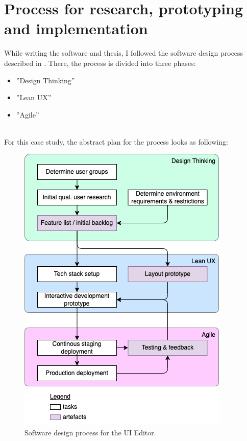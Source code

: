 \newpage
\section{Process for research, prototyping and implementation}

While writing the software and thesis, I followed the software design process described in \cite[p. 104]{LearnHCI:2020ys}.
There, the process is divided into three phases: 
\\
\begin{minipage}{\linewidth}
  \begin{itemize}
    \item ''Design Thinking''
    \item ''Lean UX''
    \item ''Agile''
  \end{itemize}
\end{minipage}
\\
For this case study, the abstract plan for the process looks as following:

\begin{figure}
  \includegraphics{pics/process.drawio.png}
  \caption{Software design process for the UI Editor.}
	\label{fig:process}
\end{figure}
